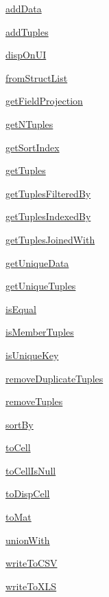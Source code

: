 \begin{list}{}{}
 \item \hyperref[method:smartdb.relations.ARelation.addData]{addData}
 \item \hyperref[method:smartdb.relations.ARelation.addTuples]{addTuples}
 \item \hyperref[method:smartdb.relations.ARelation.dispOnUI]{dispOnUI}
 \item \hyperref[method:smartdb.relations.ARelation.fromStructList]{fromStructList}
 \item \hyperref[method:smartdb.relations.ARelation.getFieldProjection]{getFieldProjection}
 \item \hyperref[method:smartdb.relations.ARelation.getNTuples]{getNTuples}
 \item \hyperref[method:smartdb.relations.ARelation.getSortIndex]{getSortIndex}
 \item \hyperref[method:smartdb.relations.ARelation.getTuples]{getTuples}
 \item \hyperref[method:smartdb.relations.ARelation.getTuplesFilteredBy]{getTuplesFilteredBy}
 \item \hyperref[method:smartdb.relations.ARelation.getTuplesIndexedBy]{getTuplesIndexedBy}
 \item \hyperref[method:smartdb.relations.ARelation.getTuplesJoinedWith]{getTuplesJoinedWith}
 \item \hyperref[method:smartdb.relations.ARelation.getUniqueData]{getUniqueData}
 \item \hyperref[method:smartdb.relations.ARelation.getUniqueTuples]{getUniqueTuples}
 \item \hyperref[method:smartdb.relations.ARelation.isEqual]{isEqual}
 \item \hyperref[method:smartdb.relations.ARelation.isMemberTuples]{isMemberTuples}
 \item \hyperref[method:smartdb.relations.ARelation.isUniqueKey]{isUniqueKey}
 \item \hyperref[method:smartdb.relations.ARelation.removeDuplicateTuples]{removeDuplicateTuples}
 \item \hyperref[method:smartdb.relations.ARelation.removeTuples]{removeTuples}
 \item \hyperref[method:smartdb.relations.ARelation.sortBy]{sortBy}
 \item \hyperref[method:smartdb.relations.ARelation.toCell]{toCell}
 \item \hyperref[method:smartdb.relations.ARelation.toCellIsNull]{toCellIsNull}
 \item \hyperref[method:smartdb.relations.ARelation.toDispCell]{toDispCell}
 \item \hyperref[method:smartdb.relations.ARelation.toMat]{toMat}
 \item \hyperref[method:smartdb.relations.ARelation.unionWith]{unionWith}
 \item \hyperref[method:smartdb.relations.ARelation.writeToCSV]{writeToCSV}
 \item \hyperref[method:smartdb.relations.ARelation.writeToXLS]{writeToXLS}
\end{list}
